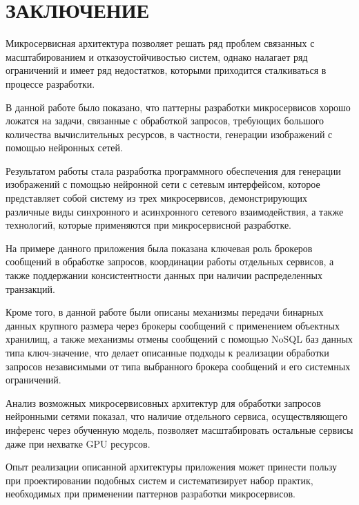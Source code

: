 \chapter*{ \large ЗАКЛЮЧЕНИЕ}

Микросервисная архитектура позволяет решать ряд проблем связанных с масштабированием и отказоустойчивостью систем, 
однако налагает ряд ограничений и имеет ряд недостатков, которыми приходится сталкиваться в процессе разработки.

В данной работе было показано, что паттерны разработки микросервисов хорошо ложатся на задачи, связанные
с обработкой запросов, требующих большого количества вычислительных ресурсов, в частности, генерации
изображений с помощью нейронных сетей.

Результатом работы стала разработка программного обеспечения для генерации изображений
с помощью нейронной сети с сетевым интерфейсом, которое представляет собой систему из трех микросервисов,
демонстрирующих различные виды синхронного и асинхронного сетевого взаимодействия, а также технологий,
которые применяются при микросервисной разработке. 

На примере данного приложения была показана ключевая роль брокеров сообщений в обработке запросов,
координации работы отдельных сервисов, а также поддержании консистентности данных при наличии 
распределенных транзакций.

Кроме того, в данной работе были описаны механизмы передачи бинарных данных крупного размера через
брокеры сообщений с применением объектных хранилищ, а также механизмы отмены сообщений с помощью
NoSQL баз данных типа ключ-значение, что делает описанные подходы к реализации обработки запросов
независимыми от типа выбранного брокера сообщений и его системных ограничений.

Анализ возможных микросервисовных архитектур для обработки запросов нейронными сетями показал,
что наличие отдельного сервиса, осуществляющего инференс через обученную модель, позволяет 
масштабировать остальные сервисы даже при нехватке GPU ресурсов.

Опыт реализации описанной архитектуры приложения может принести пользу при проектировании подобных систем
и систематизирует набор практик, необходимых при применении паттернов разработки микросервисов.

